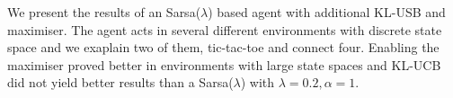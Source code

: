 We present the results of an Sarsa($\lambda$) based agent with additional KL-USB and maximiser. The agent acts in several different environments with discrete state space and we exaplain two of them, tic-tac-toe and connect four.
Enabling the maximiser proved better in environments with large state spaces and KL-UCB did not yield better results than a Sarsa($\lambda$) with $\lambda = 0.2, \alpha = 1$.